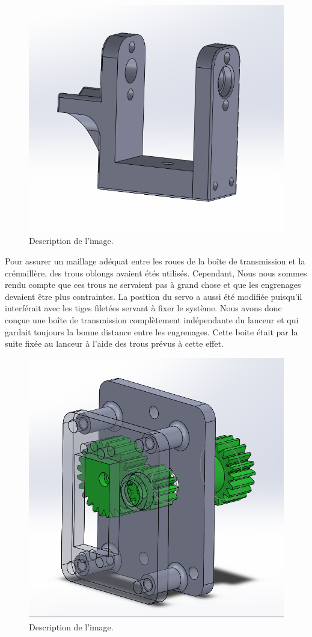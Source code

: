 \begin{figure}[h!]
    \centering
    \includegraphics[width=0.5\linewidth]{img/s2/cad/motorholer}
    \caption{Description de l'image.}
    \label{fig:s2-cad-motorholer}
\end{figure}


Pour assurer un maillage adéquat entre les roues de la boîte de transmission et la crémaillère, des trous oblongs avaient étés utilisés.
Cependant, Nous nous sommes rendu compte que ces trous ne servaient pas à grand chose et que les engrenages devaient être plus contraintes.
La position du servo a aussi été modifiée puisqu’il interférait avec les tiges filetées servant à fixer le système.
Nous avons donc conçue une boîte de transmission complètement indépendante du lanceur et qui gardait toujours la bonne distance entre les engrenages.
Cette boite était par la suite fixée au lanceur à l’aide des trous prévus à cette effet.

\begin{figure}[h!]
    \centering
    \includegraphics[width=0.5\linewidth]{img/s2/cad/gearbox2}
    \caption{Description de l'image.}
    \label{fig:s2-cad-gearbox2}
\end{figure}

